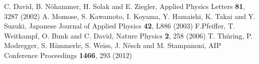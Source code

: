 \documentclass[a4paper]{article}
\begin{document}
\begin{thebibliography}{9}

C. David, B. N\"ohammer, H. Solak and E. Ziegler, Applied Physics Letters
\textbf{81}, 3287 (2002)
A. Momose, S. Kawamoto, I. Koyama, Y. Hamaishi, K. Takai and Y. Suzuki,
Japanese Journal of Applied Physics
\textbf{42}, L886 (2003)
F.Pfeiffer, T. Weitkampf, O. Bunk and C. David, Nature Physics
\textbf{2}, 258 (2006)
    T. Th\"uring, P. Modregger, S. H\"ammerle, S. Weiss, J. N\"esch and M.
    Stampanoni, AIP Conference Proceedings
\textbf{1466}, 293 (2012)
\end{thebibliography}
\end{document}
